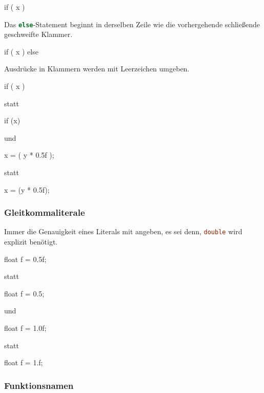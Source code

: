 \documentclass{homework-pp}
\renewcommand{\c}[1]{\lstinline[language=c,basicstyle=\ttfamily]|#1|}
\begin{document}
\begin{cblock}
if ( x ) {

}
\end{cblock}

Das \c{else}-Statement beginnt in derselben Zeile wie die vorhergehende schließende geschweifte Klammer.

\begin{cblock}
if ( x ) {
} else {
}
\end{cblock}

Ausdrücke in Klammern werden mit Leerzeichen umgeben.

\begin{cblock}
if ( x ) {

}
\end{cblock}

statt

\begin{cblock}
if (x) {

}
\end{cblock}

und

\begin{cblock}
x = ( y * 0.5f );
\end{cblock}

statt

\begin{cblock}
x = (y * 0.5f);
\end{cblock}

\subsubsection{Gleitkommaliterale}

Immer die Genauigkeit eines Literals mit angeben, es sei denn, \c{double} wird explizit benötigt.

\begin{cblock}
float f = 0.5f;
\end{cblock}
statt
\begin{cblock}
float f = 0.5;
\end{cblock}

und

\begin{cblock}
float f = 1.0f;
\end{cblock}
statt
\begin{cblock}
float f = 1.f;
\end{cblock}

\subsubsection{Funktionsnamen}
\end{document}
